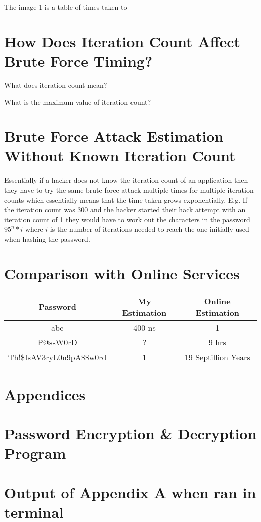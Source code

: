 \documentclass[a4paper, twoside, 11pt]{article}
\begin{document}
 The image 1 is a table of times taken to 

\section{How Does Iteration Count Affect Brute Force Timing?}
What does iteration count mean?

What is the maximum value of iteration count?

\section{Brute Force Attack Estimation Without Known Iteration Count}
Essentially if a hacker does not know the iteration count of an application then they have to try the same brute
force attack multiple times for multiple iteration counts which essentially means that the time taken grows exponentially.
E.g. If the iteration count was 300 and the hacker started their hack attempt with an iteration count of 1 they would have
to work out the characters in the password $95^n*i$ where $i$ is the number of iterations needed to reach the one initially
used when hashing the password.



\section{Comparison with Online Services}
\begin{center}
	\begin{tabular}{ |c|c|c| } 
	 \hline
	 Password & My Estimation & Online Estimation  \\
	 \hline
	 abc & 400 ns & 1 \\ 
	 P@ssW0rD & ? & 9 hrs \\ 
	 Th!\$IsAV3ryL0n9pA\$\$w0rd & 1 & 19 Septillion Years \\ 
	 \hline
	\end{tabular}
\end{center}

\newpage
\section*{Appendices}
\appendix
\section{Password Encryption \& Decryption Program}

\newpage
\section{Output of Appendix A when ran in terminal}

\end{document}
